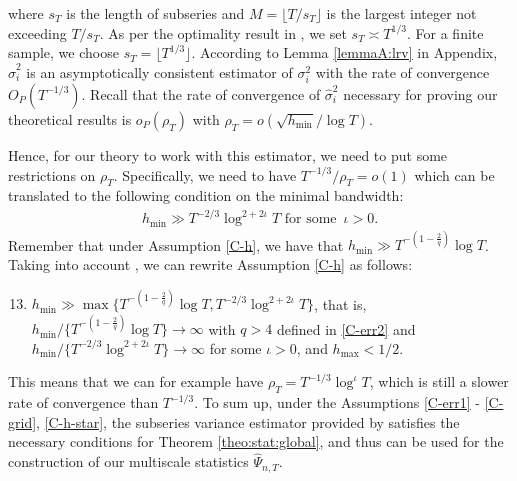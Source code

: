 \documentclass[a4paper,12pt]{article}
\makeatletter
\renewcommand{\eqref}[1]{\tagform@{\ref{#1}}}
\makeatother
\begin{document}
where $s_T$ is the length of subseries and $M = \lfloor T/s_T\rfloor$ is the largest integer not exceeding $T/s_T$. As per the optimality result in \cite{Carlstein1986}, we set $s_T \asymp T^{1/3}$. For a finite sample, we choose $s_T = \lfloor T^{1/3}\rfloor$. According to  Lemma \ref{lemmaA:lrv} in Appendix, $\widehat{\sigma}_i^2$ is an asymptotically consistent estimator of $\sigma_i^2$ with the rate of convergence $O_P(T^{-1/3})$. Recall that the rate of convergence of $\widehat{\sigma}^2_i$ necessary for proving our theoretical results is $o_P(\rho_T)$ with $\rho_T = o(\sqrt{h_{\min}}/\log T)$. {\color{red}Hence, for our theory to work with this estimator, we need to put some restrictions on $\rho_T$. Specifically, we need to have \linebreak $T^{-1/3}/\rho_T = o(1)$ which can be translated to the following condition on the minimal bandwidth:
\begin{align}\label{eq:hmin}
h_{\min} \gg T^{-2/3}\log^{2+2\iota} T \text{ for some} \,\,\, \iota >0.
\end{align} Remember that under Assumption \ref{C-h}, we have that $h_{\min} \gg T^{- \left(1 - \frac{2}{q}\right)}\log T$. Taking into account \eqref{eq:hmin}, we can rewrite Assumption \ref{C-h} as follows:

\begin{enumerate}[label=(C\arabic*$^\ast$),leftmargin=1.40cm]
\setcounter{enumi}{12}
\item \label{C-h-star} $h_{\min} \gg \max\{ T^{-(1-\frac{2}{q})} \log T, T^{-2/3}\log^{2+2\iota}  T \}$, that is, $h_{\min} / \{ T^{-(1-\frac{2}{q})} \log T \} \rightarrow \infty$ with $q > 4$ defined in \ref{C-err2} and $h_{\min} / \{ T^{-2/3}\log^{2+2\iota}  T \} \rightarrow \infty$ for some $\iota >0$, and $h_{\max} < 1/2$.
\end{enumerate}

This means that we can for example have $\rho_T = T^{-1/3}\log^\iota T$, which is still a slower rate of convergence than $T^{-1/3}$. To sum up, under the Assumptions \ref{C-err1} - \ref{C-grid}, \ref{C-h-star}, the subseries variance estimator provided by \eqref{eq:lrv} satisfies the necessary conditions for Theorem \ref{theo:stat:global}, and thus can be used for the construction of our multiscale statistics $\widehat{\Psi}_{n, T}$.}
\end{document}
